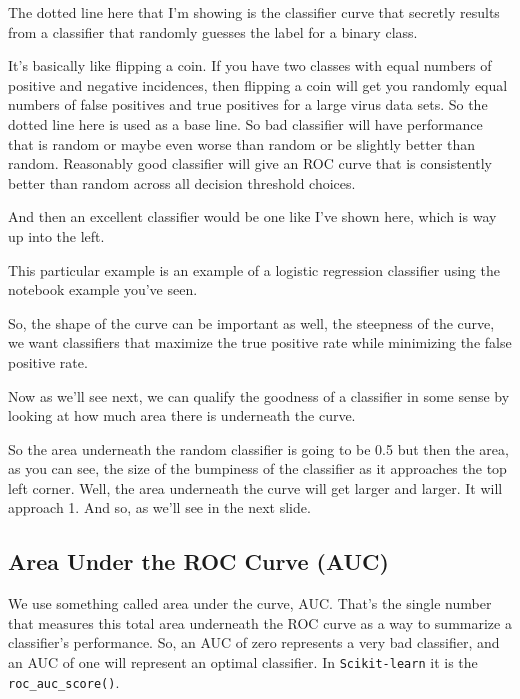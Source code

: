 \begin{multicols}{2}
The dotted line here that I'm showing is the classifier curve that secretly results from a classifier that randomly guesses the label for a binary class. 

It's basically like flipping a coin. If you have two classes with equal numbers of positive and negative incidences, then flipping a coin will get you randomly equal numbers of false positives and true positives for a large virus data sets. So the dotted line here is used as a base line. So bad classifier will have performance that is random or maybe even worse than random or be slightly better than random. Reasonably good classifier will give an ROC curve that is consistently better than random across all decision threshold choices. 

And then an excellent classifier would be one like I've shown here, which is way up into the left. 

This particular example is an example of a logistic regression classifier using the notebook example you've seen. 

So, the shape of the curve can be important as well, the steepness of the curve, we want classifiers that maximize the true positive rate while minimizing the false positive rate. 

Now as we'll see next, we can qualify the goodness of a classifier in some sense by looking at how much area there is underneath the curve. 

So the area underneath the random classifier is going to be 0.5 but then the area, as you can see, the size of the bumpiness of the classifier as it approaches the top left corner. Well, the area underneath the curve will get larger and larger. It will approach 1. And so, as we'll see in the next slide. 

\subsection{Area Under the ROC Curve (AUC)}

We use something called area under the curve, AUC. That's the single number that measures this total area underneath the ROC curve as a way to summarize a classifier's performance. So, an AUC of zero represents a very bad classifier, and an AUC of one will represent an optimal classifier. In \texttt{Scikit-learn} it is the \texttt{roc_auc_score()}.

\end{multicols}